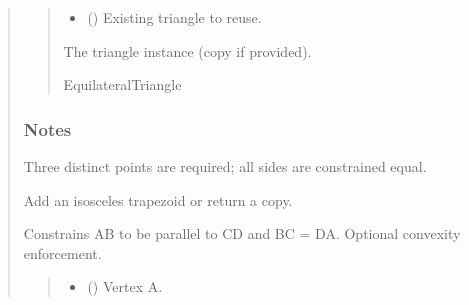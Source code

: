 \documentclass[letterpaper,10pt,english]{sphinxmanual}
\begin{document}
\begin{quote}
\begin{fulllineitems}
\begin{fulllineitems}
\begin{quote}
\begin{description}
\begin{itemize}
\item {} 
\sphinxAtStartPar
{} (\sphinxstyleliteralemphasis{\sphinxupquote{ | }}) \textendash{} Existing triangle to reuse.

\end{itemize}

\sphinxAtStartPar
The triangle instance (copy if provided).

\sphinxAtStartPar
EquilateralTriangle

\end{description}\end{quote}
\subsubsection*{Notes}

\sphinxAtStartPar
Three distinct points are required; all sides are constrained equal.

\end{fulllineitems}


\begin{fulllineitems}
\label{\detokenize{pygeox:pygeox.add_objects.AddNamespace.isosceles_trapezoid}}
\pysigstartsignatures
\pysiglinewithargsret
{}
{\sphinxparamcomma {}\sphinxparamcomma {}\sphinxparamcomma {}\sphinxparamcomma {}\sphinxparamcomma {}\sphinxparamcomma {}}
{}
\pysigstopsignatures
\sphinxAtStartPar
Add an isosceles trapezoid or return a copy.

\sphinxAtStartPar
Constrains AB to be parallel to CD and BC = DA. Optional convexity enforcement.
\begin{quote}\begin{description}
\begin{itemize}
\item {} 
\sphinxAtStartPar
{} (\sphinxstyleliteralemphasis{\sphinxupquote{ | }}) \textendash{} Vertex A.


\end{itemize}
\end{description}
\end{quote}
\end{fulllineitems}
\end{fulllineitems}
\end{quote}
\end{document}
